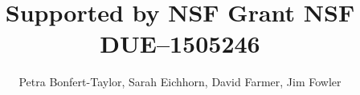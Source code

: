 \documentclass[final]{beamer}
\title{Supported by NSF Grant NSF DUE--1505246}
\author{Petra Bonfert-Taylor, Sarah Eichhorn, David Farmer, Jim Fowler}
\begin{document}
{

\newenvironment{sectionblock}[1]{\begin{block}{\rule{0pt}{1in}#1}}{\end{block}}

\begin{frame}[fragile]{}
  \begin{columns}[t]

    \begin{column}{0.32\linewidth}
      
    \end{column}%

    \begin{column}{0.32\linewidth}
      
    \end{column}%

    \begin{column}{0.32\linewidth}
      
    \end{column}
 
  \end{columns}
\end{frame}
}
\end{document}
